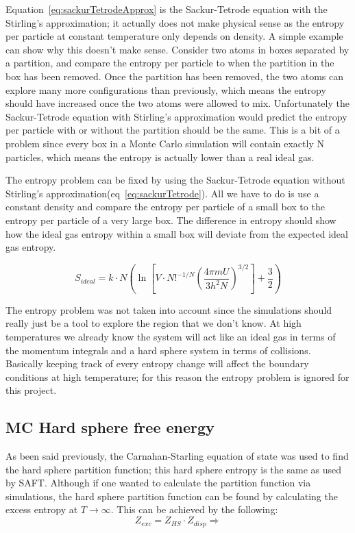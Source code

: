 Equation~\ref{eq:sackurTetrodeApprox} is the Sackur-Tetrode\cite{sackurTetrode} equation with the Stirling's approximation; it actually does not make physical sense as the entropy per particle at constant temperature only depends on density. A simple example can show why this doesn't make sense. Consider two atoms in boxes separated by a partition, and compare the entropy per particle to when the partition in the box has been removed. Once the partition has been removed, the two atoms can explore many more configurations than previously, which means the entropy should have increased once the two atoms were allowed to mix. Unfortunately the Sackur-Tetrode equation with Stirling’s approximation would predict the entropy per particle with or without the partition should be the same. This is a bit of a problem since every box in a Monte Carlo simulation will contain exactly N particles, which means the entropy is actually lower than a real ideal gas.

The entropy problem can be fixed by using the Sackur-Tetrode\cite{sackurTetrode} equation without Stirling's approximation(eq~\ref{eq:sackurTetrode}). All we have to do is use a constant density and compare the entropy per particle of a small box to the entropy per particle of a very large box. The difference in entropy should show how the ideal gas entropy within a small box will deviate from the expected ideal gas entropy.

\begin{equation}\label{eq:sackurTetrode}
S_{ideal}=k\cdot N \left ( \ln\left [ V\cdot N!^{-1/N}\left ( \frac{4 \pi mU}{3 h^2N}\right)^{3/2}  \right]+\frac{3}{2}\right )
\end{equation}

The entropy problem was not taken into account since the simulations should really just be a tool to explore the region that we don't know. At high temperatures we already know the system will act like an ideal gas in terms of the momentum integrals and a hard sphere system in terms of collisions. Basically keeping track of every entropy change will affect the boundary conditions at high temperature; for this reason the entropy problem is ignored for this project.


\subsection{MC Hard sphere free energy}
As been said previously, the Carnahan-Starling equation of state was used to find the hard sphere partition function; this hard sphere entropy is the same as used by SAFT. Although if one wanted to calculate the partition function via simulations, the hard sphere partition function can be found by calculating the excess entropy at $T\to\infty$. This can be achieved by the following:
\begin{equation}\label{eq:MCHS1}
Z_{exc}=Z_{HS}\cdot Z_{disp}\Rightarrow
\end{equation}


